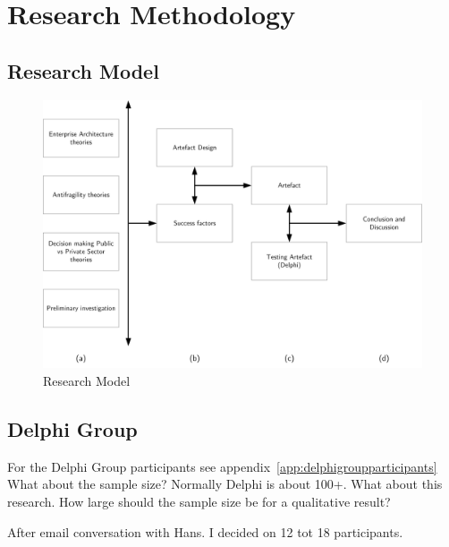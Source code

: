 \chapter{Research Methodology}
\label{ch:research-methodology}

\section{Research Model}
\label{sec:research-model}
	\begin{figure}[h]
		\centering
		\includegraphics[width=12cm]{images/research-model.png}
		\caption[Research Model]{Research Model}
		\label{fig:research-model}
	\end{figure}

\section{Delphi Group}
For the Delphi Group participants see appendix~\ref{app:delphigroupparticipants} \\%

What about the sample size? Normally Delphi is about 100+. What about this research. How large should the sample size be for a qualitative result?\
\begin{remark}
	After email conversation with Hans. I decided on 12 tot 18 participants.
\end{remark}

